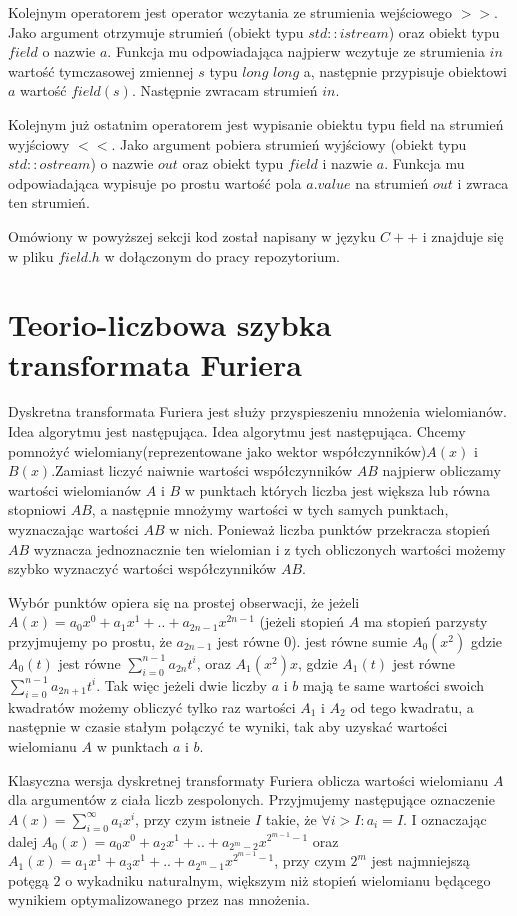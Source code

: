 \documentclass{article}
\begin{document}
Kolejnym operatorem jest operator wczytania ze strumienia wejściowego $>>$.
Jako argument otrzymuje strumień (obiekt typu
$std::istream$) oraz obiekt typu $field$ o nazwie $a$.
Funkcja mu odpowiadająca najpierw wczytuje ze strumienia $in$ wartość tymczasowej zmiennej $s$ typu $long$ $long$
a, następnie przypisuje obiektowi $a$ wartość $field(s)$. Następnie zwracam strumień $in$.

Kolejnym już ostatnim operatorem jest wypisanie obiektu typu field na strumień wyjściowy
$<<$. Jako argument pobiera strumień wyjściowy (obiekt typu $std::ostream$) o nazwie $out$ oraz 
obiekt typu $field$ i nazwie $a$. Funkcja mu odpowiadająca wypisuje po prostu wartość pola 
$a.value$ na strumień $out$ i zwraca ten strumień. 

Omówiony w powyższej sekcji kod został napisany w języku $C++$ i znajduje się w 
pliku $field.h$ w dołączonym do pracy repozytorium.

\section{Teorio-liczbowa szybka transformata Furiera}

Dyskretna transformata Furiera jest służy przyspieszeniu mnożenia wielomianów. Idea algorytmu jest następująca. Idea algorytmu jest następująca. Chcemy pomnożyć wielomiany(reprezentowane jako wektor współczynników)$A(x)$ i $B(x).$Zamiast liczyć naiwnie wartości współczynników $AB$ najpierw obliczamy wartości wielomianów $A$ i $B$ w punktach których liczba jest większa lub równa stopniowi $AB$, a następnie mnożymy 
wartości w tych samych punktach, wyznaczając wartości $AB$ w nich. Ponieważ liczba punktów
przekracza stopień $AB$ wyznacza jednoznacznie ten wielomian i z tych obliczonych wartości możemy szybko wyznaczyć wartości współczynników $AB$. 

Wybór punktów opiera się na prostej obserwacji, że jeżeli $A(x) = a_0x^0+a_1x^1+..+a_{2n-1}x^{2n-1}$
(jeżeli stopień $A$ ma stopień parzysty przyjmujemy po prostu, że $a_{2n-1}$ jest równe $0$). jest równe
sumie $A_0(x^2)$ gdzie $A_0(t)$ jest równe $\sum_{i=0}^{n-1}a_{2n}t^{i}$, oraz 
$A_1(x^2)x$, gdzie $A_1(t)$ jest równe $\sum_{i=0}^{n-1}a_{2n+1}t^{i}$. Tak więc jeżeli dwie
liczby $a$ i $b$ mają te same wartości swoich kwadratów możemy obliczyć tylko raz wartości $A_1$ i $A_2$
od tego kwadratu, a następnie w czasie stałym połączyć te wyniki, tak aby uzyskać wartości 
wielomianu $A$ w punktach $a$ i $b$. 


Klasyczna wersja dyskretnej transformaty Furiera oblicza wartości wielomianu $A$ dla
argumentów z ciała liczb zespolonych. Przyjmujemy następujące oznaczenie $A(x)=\sum_{i=0}^{\infty}a_ix^i$,
przy czym istneie $I$ takie, że $\forall i>I: a_i = I$. I oznaczając dalej 
 $A_0(x) = a_0x^0+a_2x^1+..+a_{2^m-2}x^{2^{m-1}-1} $
oraz $A_1(x) = a_1x^1+a_3x^1+..+a_{2^m-1}x^{2^{m-1}-1} $, przy czym $2^m$ jest najmniejszą
potęgą $2$ o wykadniku naturalnym, większym niż stopień wielomianu będącego wynikiem optymalizowanego 
przez nas mnożenia. 
\end{document}

